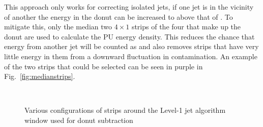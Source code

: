 This approach only works for correcting isolated jets, if one jet is
in the vicinity of another the energy in the donut can be increased to
above that of \PU. To mitigate this, only the median two $4\times1$
\TT strips of the four that make up the donut are used to calculate
the PU energy density. This reduces the chance that energy from
another jet will be counted as \PU and also removes strips that have
very little energy in them from a downward fluctuation in \PU
contamination. An example of the two strips that could be selected can
be seen in purple in Fig.~\ref{fig:medianstrips}.

\begin{figure}
  \centering
  ~ 
  ~
  \\
  \caption{Various configurations of \TT strips around the Level-1 jet
  algorithm window used for donut subtraction}
  \label{fig:alldonutstrips}
\end{figure}


